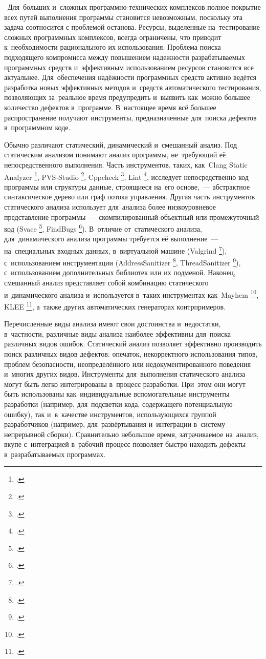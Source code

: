\actuality\
Для~больших и~сложных программно-технических комплексов полное покрытие всех путей выполнения программы становится невозможным, поскольку эта задача соотносится с проблемой останова. Ресурсы, выделенные на~тестирование сложных программных комплексов, всегда ограничены, что приводит к~необходимости рационального  их использования. Проблема поиска подходящего компромисса  между повышением надежности разрабатываемых программных средств и~эффективным использованием ресурсов становится все актуальнее. Для~обеспечения надёжности программных средств  активно ведётся разработка новых эффективных методов и~средств автоматического тестирования, позволяющих за~реальное время предупредить и~выявить как~можно большее количество дефектов в~программе. В~настоящее время всё большее распространение получают инструменты, предназначенные для~поиска дефектов в~программном коде.

Обычно различают статический, динамический и~смешанный анализ. Под статическим анализом понимают анализ программы, не~требующий её непосредственного выполнения. Часть инструментов, таких, как~Clang Static Analyzer \footcite{csa}, PVS-Studio \footcite{pvs}, Cppcheck \footcite{cppcheck}, Lint \footcite{lint}, исследует непосредственно код программы или структуры данные, строящиеся на~его основе,~--- абстрактное синтаксическое дерево или граф потока управления. Другая часть инструментов статического анализа использует для~анализа более низкоуровневое представление программы~--- скомпилированный объектный или промежуточный код (Svace \footcite{svace}, FindBugs \footcite{findbugs}). В~отличие от~статического анализа, для~динамического анализа программы требуется её выполнение~--- на~специальных входных данных, в~виртуальной машине (Valgrind \footcite{valgrind}), с~использованием инструментации (AddressSanitizer \footcite{asan}, ThreadSanitizer \footcite{tsan}), с~использованием дополнительных библиотек или их подменой. Наконец, смешанный анализ представляет собой комбинацию статического и~динамического анализа и~используется в~таких инструментах как~Mayhem \footcite{mayhem}, KLEE \footcite{klee}, а~также других автоматических генераторах контрпримеров.

Перечисленные виды анализа имеют свои достоинства и~недостатки, в~частности, различные виды анализа наиболее эффективны для~поиска различных видов ошибок. Статический анализ позволяет эффективно производить поиск различных видов дефектов: опечаток, некорректного использования типов, проблем безопасности, неопределённого или недокументированного поведения и~многих других видов. Инструменты для~выполнения статического анализа могут быть легко интегрированы в~процесс разработки. При~этом они могут быть использованы как~индивидуальные вспомогательные инструменты разработки (например, для~подсветки кода, содержащего потенциальную ошибку), так и~в~качестве инструментов, использующихся группой разработчиков (например, для~развёртывания и~интеграции в~систему непрерывной сборки). Сравнительно небольшое время, затрачиваемое на~анализ, вкупе с~интеграцией в~рабочий процесс позволяет быстро находить дефекты в~разрабатываемых программах.

